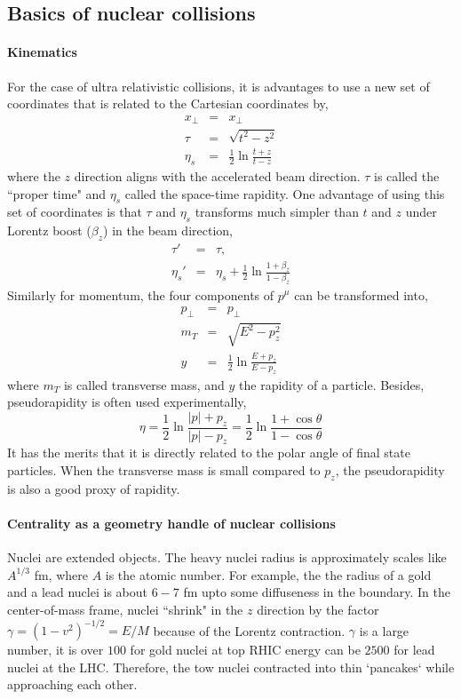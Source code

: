 \subsection{Basics of nuclear collisions}
\paragraph{Kinematics} For the case of ultra relativistic collisions, it is advantages to use a new set of coordinates that is related to the Cartesian coordinates by,
\begin{eqnarray}
x_\perp &=& x_\perp\\
\tau &=& \sqrt{t^2 - z^2}\\
\eta_s &=& \frac{1}{2}\ln\frac{t+z}{t-z}
\end{eqnarray}
where the $z$ direction aligns with the accelerated beam direction.
$\tau$ is called the ``proper time" and $\eta_s$ called the space-time rapidity.
One advantage of using this set of coordinates is that $\tau$ and $\eta_s$ transforms much simpler than $t$ and $z$ under Lorentz boost ($\beta_z$) in the beam direction,
\begin{eqnarray}
\tau' &=& \tau,\\
\eta_s' &=& \eta_s + \frac{1}{2}\ln\frac{1+\beta_z}{1-\beta_z}
\end{eqnarray}
Similarly for momentum, the four components of $p^\mu$ can be transformed into,
\begin{eqnarray}
p_\perp &=& p_\perp\\
m_T &=& \sqrt{E^2 - p_z^2}\\
y &=& \frac{1}{2}\ln\frac{E+p_z}{E-p_z}
\end{eqnarray}
where $m_T$ is called transverse mass, and $y$ the rapidity of a particle.
Besides, pseudorapidity is often used experimentally,
\begin{equation}
\eta = \frac{1}{2}\ln\frac{|p|+p_z}{|p|-p_z} = \frac{1}{2}\ln\frac{1+\cos\theta}{1-\cos\theta}
\end{equation}
It has the merits that it is directly related to the polar angle of final state particles.
When the transverse mass is small compared to $p_z$, the pseudorapidity is also a good proxy of rapidity.

\paragraph{Centrality as a geometry handle of nuclear collisions}
Nuclei are extended objects.
The heavy nuclei radius is approximately scales like $A^{1/3}$ fm, where  $A$ is the atomic number. 
For example, the the radius of a gold and a lead nuclei is about $6-7$ fm upto some diffuseness in the boundary.
In the center-of-mass frame,  nuclei ``shrink" in the $z$ direction by the factor $\gamma = (1-v^2)^{-1/2} = E/M$ because of the Lorentz contraction.
$\gamma$ is a large number, it is over $100$ for gold nuclei at top RHIC energy can be $2500$ for lead nuclei at the LHC.
Therefore, the tow nuclei contracted into thin `pancakes` while approaching each other.

